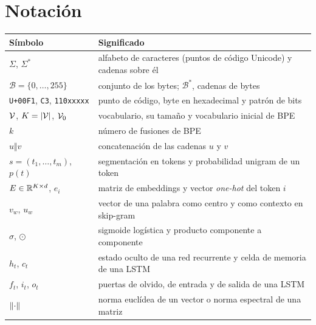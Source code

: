 \documentclass[11pt,a4paper,twoside,openany]{book}
\newcommand{\hx}[1]{\texttt{#1}}
\newcommand{\bits}[1]{\texttt{#1}}
\begin{document}
\section*{Notación}
\begin{center}\small
\begin{tabularx}{\textwidth}{@{}l>{\raggedright\arraybackslash}X@{}}
\toprule
Símbolo & Significado \\
\midrule
$\Sigma$, $\Sigma^{*}$ & alfabeto de caracteres (puntos de código Unicode) y cadenas sobre él \\
$\mathcal{B}=\{0,\dots,255\}$ & conjunto de los bytes; $\mathcal{B}^{*}$, cadenas de bytes \\
\hx{U+00F1}, \hx{C3}, \bits{110xxxxx} & punto de código, byte en hexadecimal y patrón de bits \\
$\mathcal{V}$, $K=\lvert\mathcal{V}\rvert$, $\mathcal{V}_0$ & vocabulario, su tamaño y vocabulario inicial de BPE \\
$k$ & número de fusiones de BPE \\
$u\Vert v$ & concatenación de las cadenas $u$ y $v$ \\
$s=(t_1,\dots,t_m)$, $p(t)$ & segmentación en tokens y probabilidad unigram de un token \\
$E\in\mathbb{R}^{K\times d}$, $e_i$ & matriz de embeddings y vector \emph{one-hot} del token $i$ \\
$v_w$, $u_w$ & vector de una palabra como centro y como contexto en skip-gram \\
$\sigma$, $\odot$ & sigmoide logística y producto componente a componente \\
$h_t$, $c_t$ & estado oculto de una red recurrente y celda de memoria de una LSTM \\
$f_t$, $i_t$, $o_t$ & puertas de olvido, de entrada y de salida de una LSTM \\
$\lVert\cdot\rVert$ & norma euclídea de un vector o norma espectral de una matriz \\
\bottomrule
\end{tabularx}
\end{center}

\tableofcontents

\mainmatter






\appendix


\backmatter

\end{document}
